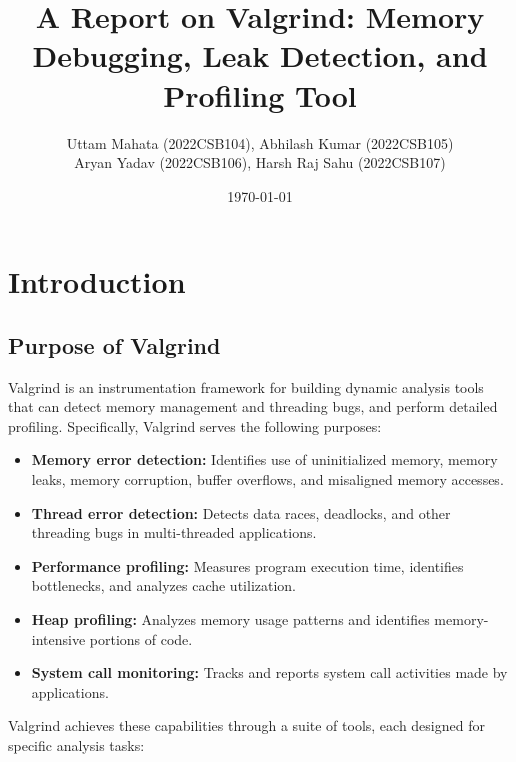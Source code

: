 \documentclass[11pt,a4paper]{article}
\title{\Huge \textbf{A Report on Valgrind: Memory Debugging, Leak Detection, and Profiling Tool}\\}
\author{
    Uttam Mahata (2022CSB104), Abhilash Kumar (2022CSB105) \\
    Aryan Yadav (2022CSB106), Harsh Raj Sahu (2022CSB107)
}
\date{\today}
\begin{document}
\maketitle
\thispagestyle{fancy}


\newpage
\tableofcontents
\newpage

\section{Introduction}

\subsection{Purpose of Valgrind}
Valgrind is an instrumentation framework for building dynamic analysis tools that can detect memory management and threading bugs, and perform detailed profiling. Specifically, Valgrind serves the following purposes:

\begin{itemize}
    \item \textbf{Memory error detection:} Identifies use of uninitialized memory, memory leaks, memory corruption, buffer overflows, and misaligned memory accesses.
    
    \item \textbf{Thread error detection:} Detects data races, deadlocks, and other threading bugs in multi-threaded applications.
    
    \item \textbf{Performance profiling:} Measures program execution time, identifies bottlenecks, and analyzes cache utilization.
    
    \item \textbf{Heap profiling:} Analyzes memory usage patterns and identifies memory-intensive portions of code.
    
    \item \textbf{System call monitoring:} Tracks and reports system call activities made by applications.
\end{itemize}

Valgrind achieves these capabilities through a suite of tools, each designed for specific analysis tasks:
\end{document}
